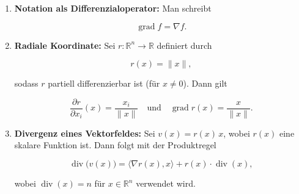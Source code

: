 \begin{beispielbox}
\begin{enumerate}
  \item \textbf{Notation als Differenzialoperator:} Man schreibt
  

$$
  \operatorname{grad} f = \nabla f.
  $$


  
  \item \textbf{Radiale Koordinate:} Sei $ r : \mathbb{R}^n \to \mathbb{R} $ definiert durch
  

$$
  r(x) = \|x\|,
  $$


  sodass $ r $ partiell differenzierbar ist (für $ x\neq 0 $). Dann gilt
  

$$
  \frac{\partial r}{\partial x_i}(x)= \frac{x_i}{\|x\|} \quad\text{und}\quad \operatorname{grad} r(x)= \frac{x}{\|x\|}.
  $$


  
  \item \textbf{Divergenz eines Vektorfeldes:} Sei $ v(x) = r(x)\, x $, wobei $ r(x) $ eine skalare Funktion ist. Dann folgt mit der Produktregel
  

$$
  \operatorname{div}\bigl( v(x) \bigr)= \langle \nabla r(x), x \rangle + r(x) \cdot \operatorname{div}(x),
  $$


  wobei $ \operatorname{div}(x)=n $ für $ x\in \mathbb{R}^n $ verwendet wird.
\end{enumerate}
\end{beispielbox}
